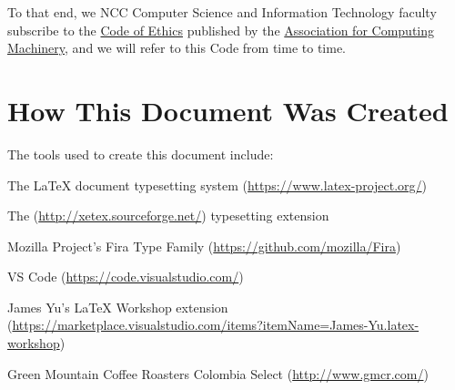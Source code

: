 To that end, we NCC Computer Science and Information Technology faculty subscribe to the \href{https://www.acm.org/code-of-ethics}{Code of Ethics} published by the \href{https://www.acm.org/}{Association for Computing Machinery}, and we will refer to this Code from time to time.

\section*{How This Document Was Created}

The tools used to create this document include:

\bi
    \item The \LaTeX{} document typesetting system (\url{https://www.latex-project.org/})
    \bi
        \item The  (\url{http://xetex.sourceforge.net/}) typesetting extension
    \ei
    \item Mozilla Project's Fira Type Family (\url{https://github.com/mozilla/Fira})
    \item VS Code (\url{https://code.visualstudio.com/})
    \bi
        \item James Yu's LaTeX Workshop extension (\url{https://marketplace.visualstudio.com/items?itemName=James-Yu.latex-workshop})
    \ei
    \item Green Mountain Coffee Roasters Colombia Select (\url{http://www.gmcr.com/})
\ei